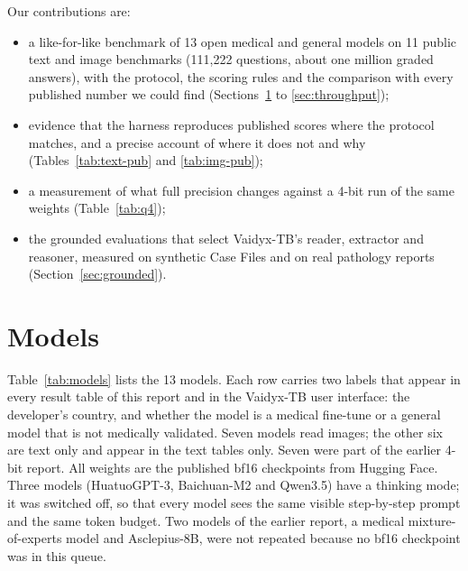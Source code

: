 \documentclass{article}
\newcommand{\fit}[1]{\adjustbox{max width=\textwidth}{#1}}
\begin{document}
Our contributions are:
\begin{itemize}
  \item a like-for-like benchmark of 13 open medical and general models on 11 public text and image benchmarks (111,222 questions, about one million graded answers), with the protocol, the scoring rules and the comparison with every published number we could find (Sections~\ref{sec:models} to \ref{sec:throughput});
  \item evidence that the harness reproduces published scores where the protocol matches, and a precise account of where it does not and why (Tables~\ref{tab:text-pub} and \ref{tab:img-pub});
  \item a measurement of what full precision changes against a 4-bit run of the same weights (Table~\ref{tab:q4});
  \item the grounded evaluations that select Vaidyx-TB's reader, extractor and reasoner, measured on synthetic Case Files and on real pathology reports (Section~\ref{sec:grounded}).
\end{itemize}

\section{Models}
\label{sec:models}

Table~\ref{tab:models} lists the 13 models. Each row carries two labels that appear in every result table of this report and in the Vaidyx-TB user interface: the developer's country, and whether the model is a medical fine-tune or a general model that is not medically validated. Seven models read images; the other six are text only and appear in the text tables only. Seven were part of the earlier 4-bit report. All weights are the published bf16 checkpoints from Hugging Face. Three models (HuatuoGPT-3, Baichuan-M2 and Qwen3.5) have a thinking mode; it was switched off, so that every model sees the same visible step-by-step prompt and the same token budget. Two models of the earlier report, a medical mixture-of-experts model and Asclepius-8B, were not repeated because no bf16 checkpoint was in this queue.

\begin{table}[htbp]
\centering\footnotesize\setlength{\tabcolsep}{5pt}
\caption{The 13 models. Type: Medical = fine-tuned for medicine; Non-medical = a general model, not medically validated. Earlier report = part of the 4-bit run of September 2026.}
\label{tab:models}
\fit{}
\end{table}
\end{document}
